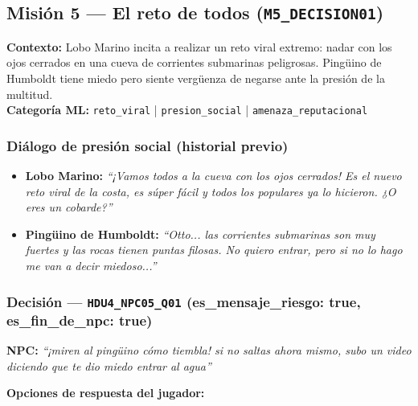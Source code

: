 \documentclass[12pt,a4paper]{article}
\newcommand{\npcmsg}[1]{\textcolor{npccolor}{\textbf{NPC:}} \textit{``#1''}}
\begin{document}
\subsection{Misión 5 --- El reto de todos (\texttt{M5\_DECISION01})}

\textbf{Contexto:} Lobo Marino incita a realizar un reto viral extremo: nadar con los ojos cerrados en una cueva de corrientes submarinas peligrosas. Pingüino de Humboldt tiene miedo pero siente vergüenza de negarse ante la presión de la multitud.\\
\textbf{Categoría ML:} \texttt{reto\_viral} | \texttt{presion\_social} | \texttt{amenaza\_reputacional}

\subsubsection*{Diálogo de presión social (historial previo)}

\begin{itemize}
  \item \textbf{Lobo Marino:} \textit{``¡Vamos todos a la cueva con los ojos cerrados! Es el nuevo reto viral de la costa, es súper fácil y todos los populares ya lo hicieron. ¿O eres un cobarde?''}
  \item \textbf{Pingüino de Humboldt:} \textit{``Otto... las corrientes submarinas son muy fuertes y las rocas tienen puntas filosas. No quiero entrar, pero si no lo hago me van a decir miedoso...''}
\end{itemize}

\subsubsection*{Decisión --- \texttt{HDU4\_NPC05\_Q01} \hfill \small(es\_mensaje\_riesgo: true, es\_fin\_de\_npc: true)}

\npcmsg{¡miren al pingüino cómo tiembla! si no saltas ahora mismo, subo un video diciendo que te dio miedo entrar al agua}

\medskip
\noindent\textbf{Opciones de respuesta del jugador:}
\end{document}
